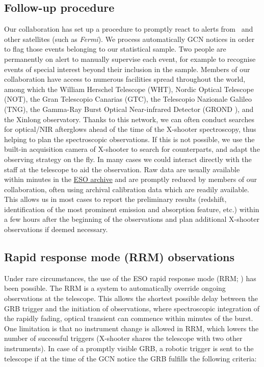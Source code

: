 \documentclass[longauth]{aa}    %
\begin{document}
\subsection{Follow-up procedure}

Our collaboration has set up a procedure to promptly react to alerts from
\swift~and other satellites (such as \textit{Fermi}). We process automatically
GCN notices in order to flag those events belonging to our statistical sample.
Two people are permanently on alert to manually supervise each event, for
example to recognise events of special interest beyond their inclusion in the
sample. Members of our collaboration have access to numerous facilities spread
throughout the world, among which the William Herschel Telescope (WHT), Nordic
Optical Telescope (NOT), the Gran Telescopio Canarias (GTC), the Telescopio
Nazionale Galileo (TNG), the Gamma-Ray Burst Optical Near-infrared Detector
(GROND \citealt{Greiner2008}), and the Xinlong observatory. Thanks to this
network, we can often conduct searches for optical/NIR afterglows ahead of the
time of the X-shooter spectroscopy, thus helping to plan the spectroscopic
observations. If this is not possible, we use the built-in acquisition camera of
X-shooter to search for counterparts, and adapt the observing strategy on the
fly. In many cases we could interact directly with the staff at the telescope to
aid the observation. Raw data are usually available within minutes in the
\href{http://archive.eso.org/wdb/wdb/eso/xshooter/form}{ESO archive} and are
promptly reduced by members of our collaboration, often using archival
calibration data which are readily available. This allows us in most cases to
report the preliminary results (redshift, identification of the most prominent
emission and absorption feature, etc.) within a few hours after the beginning of
the observations and plan additional X-shooter observations if deemed necessary.

\subsection{Rapid response mode (RRM) observations} \label{RRM}

Under rare circumstances, the use of the ESO rapid response mode (RRM;
\citealt{Vreeswijk2010}) has been possible. The RRM is a system to automatically
override ongoing observations at the telescope. This allows the shortest
possible delay between the GRB trigger and the initiation of observations, where
spectroscopic integration of the rapidly fading, optical transient can commence
within minutes of the burst. One limitation is that no instrument change is
allowed in RRM, which lowers the number of successful triggers (X-shooter shares the telescope with two other instruments). In case of a promptly visible GRB, a robotic
trigger is sent to the telescope if at the time of the GCN notice the GRB
fulfills the following criteria:
\end{document}
